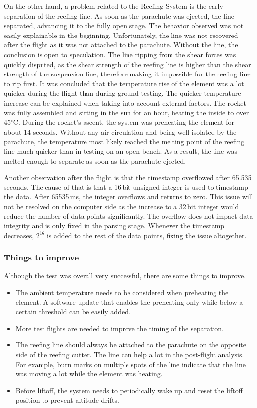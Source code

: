 On the other hand, a problem related to the Reefing System is the early separation of the reefing line. As soon as the parachute was ejected, the line separated, advancing it to the fully open stage. The behavior observed was not easily explainable in the beginning. Unfortunately, the line was not recovered after the flight as it was not attached to the parachute. Without the line, the conclusion is open to speculation. The line ripping from the shear forces was quickly disputed, as the shear strength of the reefing line is higher than the shear strength of the suspension line, therefore making it impossible for the reefing line to rip first. It was concluded that the temperature rise of the element was a lot quicker during the flight than during ground testing. The quicker temperature increase can be explained when taking into account external factors. The rocket was fully assembled and sitting in the sun for an hour, heating the inside to over 45$^{\circ}$C. During the rocket's ascent, the system was preheating the element for about 14 seconds. Without any air circulation and being well isolated by the parachute, the temperature most likely reached the melting point of the reefing line much quicker than in testing on an open bench. As a result, the line was melted enough to separate as soon as the parachute ejected.

Another observation after the flight is that the timestamp overflowed after 65.535 seconds. The cause of that is that a 16\,bit unsigned integer is used to timestamp the data. After 65535\,ms, the integer overflows and returns to zero. This issue will not be resolved on the computer side as the increase to a 32\,bit integer would reduce the number of data points significantly. The overflow does not impact data integrity and is only fixed in the parsing stage. Whenever the timestamp decreases, $2^{16}$ is added to the rest of the data points, fixing the issue altogether.

\subsubsection{Things to improve}
Although the test was overall very successful, there are some things to improve.
\begin{itemize}
    \item The ambient temperature needs to be considered when preheating the element. A software update that enables the preheating only while below a certain threshold can be easily added.
    \item More test flights are needed to improve the timing of the separation.
    \item The reefing line should always be attached to the parachute on the opposite side of the reefing cutter. The line can help a lot in the post-flight analysis. For example, burn marks on multiple spots of the line indicate that the line was moving a lot while the element was heating.
    \item Before liftoff, the system needs to periodically wake up and reset the liftoff position to prevent altitude drifts. 
\end{itemize}
